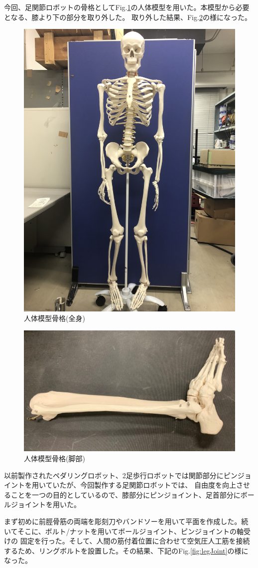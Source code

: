 今回、足関節ロボットの骨格としてFig.\ref{fig:bodyBone}の人体模型を用いた。本模型から必要となる、膝より下の部分を取り外した。
取り外した結果、Fig.\ref{fig:legBone}の様になった。
\begin{figure}[h]
    \begin{center}
     \includegraphics[width=0.4\columnwidth,clip]{./2_measurement/bodyBone.eps}
     \caption{人体模型骨格(全身)}
     \label{fig:bodyBone}
    \end{center}
\end{figure}
\begin{figure}[h]
    \begin{center}
     \includegraphics[width=0.6\columnwidth,clip]{./2_measurement/legBone.eps}
     \caption{人体模型骨格(脚部)}
     \label{fig:legBone}
    \end{center}
\end{figure}
\newpage
以前製作されたペダリングロボット、2足歩行ロボットでは関節部分にピンジョイントを用いていたが、今回製作する足関節ロボットでは、
自由度を向上させることを一つの目的としているので、膝部分にピンジョイント、足首部分にボールジョイントを用いた。

まず初めに前脛骨筋の両端を彫刻刀やバンドソーを用いて平面を作成した。続いてそこに、ボルト/ナットを用いてボールジョイント、ピンジョイントの軸受けの
固定を行った。そして、人間の筋付着位置に合わせて空気圧人工筋を接続するため、リングボルトを設置した。その結果、下記のFig.\ref{fig:legJoint}の様になった。

